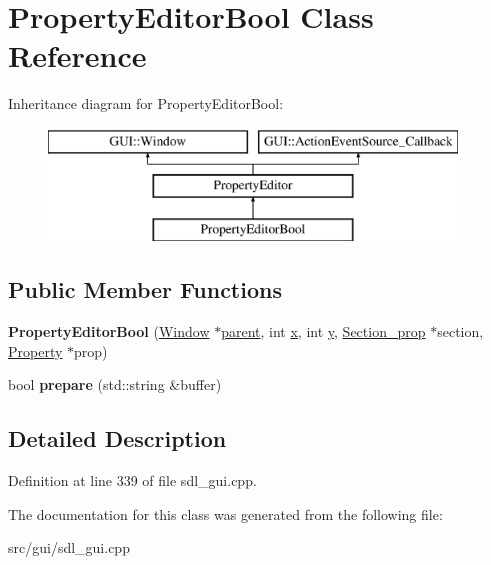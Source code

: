 \hypertarget{classPropertyEditorBool}{\section{Property\-Editor\-Bool Class Reference}
\label{classPropertyEditorBool}
}
Inheritance diagram for Property\-Editor\-Bool\-:\begin{figure}[H]
\begin{center}
\leavevmode
\includegraphics[height=3.000000cm]{classPropertyEditorBool}
\end{center}
\end{figure}
\subsection*{Public Member Functions}
\begin{DoxyCompactItemize}
\item 
\hypertarget{classPropertyEditorBool_a428b59bceb9e5d0c7fae949eb43511da}{{\bfseries Property\-Editor\-Bool} (\hyperlink{classGUI_1_1Window_ae828e9daa964dfc65a3550fb03117d30}{Window} $\ast$\hyperlink{classGUI_1_1Window_a2e593ff65e7702178d82fe9010a0b539}{parent}, int \hyperlink{classGUI_1_1Window_a6ca6a80ca00c9e1d8ceea8d3d99a657d}{x}, int \hyperlink{classGUI_1_1Window_a0ee8e923aff2c3661fc2e17656d37adf}{y}, \hyperlink{classSection__prop}{Section\-\_\-prop} $\ast$section, \hyperlink{classProperty}{Property} $\ast$prop)}\label{classPropertyEditorBool_a428b59bceb9e5d0c7fae949eb43511da}

\item 
\hypertarget{classPropertyEditorBool_a44c917ecde4468be2873d8580d5072ce}{bool {\bfseries prepare} (std\-::string \&buffer)}\label{classPropertyEditorBool_a44c917ecde4468be2873d8580d5072ce}

\end{DoxyCompactItemize}


\subsection{Detailed Description}


Definition at line 339 of file sdl\-\_\-gui.\-cpp.



The documentation for this class was generated from the following file\-:\begin{DoxyCompactItemize}
\item 
src/gui/sdl\-\_\-gui.\-cpp\end{DoxyCompactItemize}
